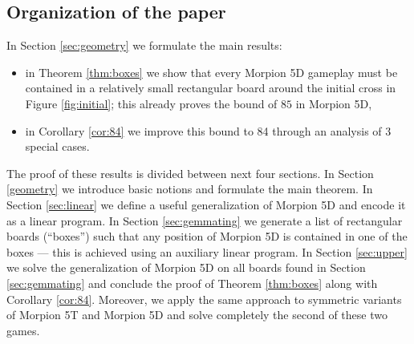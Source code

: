 
\subsection{Organization of the paper}
In Section \ref{sec:geometry} we formulate the main results:
\begin{itemize}
\item in Theorem \ref{thm:boxes} we show that every Morpion 5D gameplay must be contained in a relatively small rectangular board around the initial cross in Figure \ref{fig:initial}; this already proves the bound of $85$ in Morpion 5D,
\item in Corollary \ref{cor:84} we improve this bound to 84 through an analysis of $3$ special cases.
\end{itemize}
The proof of these results is divided between next four sections. In Section \ref{geometry} we introduce basic notions and formulate the main theorem. In Section \ref{sec:linear} we define a useful generalization of Morpion 5D  and encode it as a linear program. In Section \ref{sec:gemmating} we generate a list of rectangular boards (``boxes'') such that any position of Morpion 5D is contained in one of the boxes --- this is achieved using an auxiliary linear program. In Section \ref{sec:upper} we solve 
the generalization of Morpion 5D on all boards found in Section \ref{sec:gemmating} and conclude the proof of Theorem \ref{thm:boxes} along with Corollary \ref{cor:84}. Moreover, we apply the same approach to symmetric variants of Morpion 5T and Morpion 5D and solve completely the second of these
two games.


